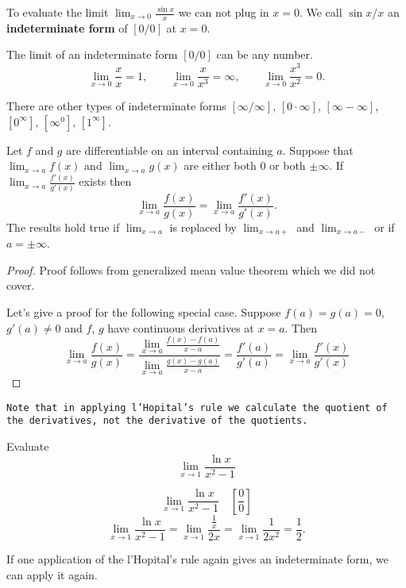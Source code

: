 \documentclass[calc1-main.tex]{subfiles}
\begin{document}
To evaluate the limit $\lim_{x \to 0} \frac{\sin x}{x}$ we can not plug in $x=0$.
We call $\sin x/ x$ an \textbf{indeterminate form} of $[0/0]$ at $x=0$.

The limit of an indeterminate form $[0/0]$ can be any number.
\[
  \lim_{x \to 0} \frac{x}{x} = 1, \qquad
  \lim_{x \to 0} \frac{x}{x^3} = \infty, \qquad
  \lim_{x \to 0} \frac{x^3}{x^2} = 0.
\]

There are other types of indeterminate forms $[\infty/\infty]$, $[0 \cdot \infty]$, $[\infty - \infty]$, $[0^{\infty}]$, $[\infty^0]$, $[1^{\infty}]$.


\begin{theorem}
  Let $f$ and $g$ are differentiable on an interval containing $a$.
  Suppose that
  $\lim_{x \to a} f(x)$ and $\lim_{x \to a} g(x)$ are either both 0 or both $\pm \infty$. If $\lim_{x \to a} \frac{f'(x)}{g'(x)}$ exists then
  \[
    \lim_{x \to a} \frac{f(x)}{g(x)} = \lim_{x \to a} \frac{f'(x)}{g'(x)}.
  \]
  The results hold true if $\lim_{x \to a}$ is replaced by $\lim_{x \to a+}$ and $\lim_{x \to a-}$ or if $a= \pm \infty$.
\end{theorem}
\begin{proof}
  Proof follows from generalized mean value theorem which we did not cover.

  Let's give a proof for the following special case. Suppose $f(a) = g(a) = 0$, $g'(a) \neq 0$ and $f$, $g$ have continuous derivatives at $x=a$. Then
\[
  \lim_{x \to a} \frac{f(x)}{g(x)} = \frac{\lim_{x \to a} \frac{f(x)-f(a)}{x-a}}{\lim_{x \to a} \frac{g(x)-g(a)}{x-a}} = \frac{f'(a)}{g'(a)} = \lim_{x \to a} \frac{f'(x)}{g'(x)}
\]
\end{proof}

\texttt{Note that in applying l'Hopital's rule we calculate the quotient of the derivatives, not the derivative of the quotients.}

\begin{example}
  Evaluate
  \[
    \lim_{x \to 1} \frac{\ln x}{x^2-1}
  \]
\end{example}
\begin{solution}
  \[
    \lim_{x \to 1} \frac{\ln x}{x^2-1} \quad \left[ \frac{0}{0} \right]
  \]
  \[
    \lim_{x \to 1} \frac{\ln x}{x^2-1} =
    \lim_{x \to 1} \frac{\frac{1}{x}}{2x} =
    \lim_{x \to 1} \frac{1}{2x^2} = \frac{1}{2}.
  \]
\end{solution}

If one application of the l'Hopital's rule again gives an indeterminate form, we can apply it again.
\end{document}
